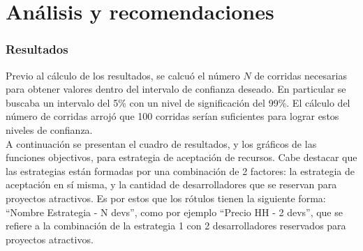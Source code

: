 \part*{Análisis y recomendaciones}

\section{Resultados}


Previo al cálculo de los resultados, se calcuó el número $N$ de corridas necesarias para obtener valores dentro del intervalo de confianza deseado. En particular se buscaba 
un intervalo del 5\% con un nivel de significación del 99\%. El cálculo del número de corridas arrojó que 100 corridas serían suficientes para lograr estos niveles de confianza.\\

A continuación se presentan el cuadro de resultados, y los gráficos de las funciones objectivos, para estrategia de aceptación de recursos. Cabe destacar que las estrategias
están formadas por una combinación de 2 factores: la estrategia de aceptación en sí misma, y la cantidad de desarrolladores que se reservan para proyectos atractivos. Es por estos
que los rótulos tienen la siguiente forma: ``Nombre Estrategia - N devs'', como por ejemplo ``Precio HH - 2 devs'', que se refiere a la combinación de la estrategia 1 con 
2 desarrolladores reservados para proyectos atractivos.\\


